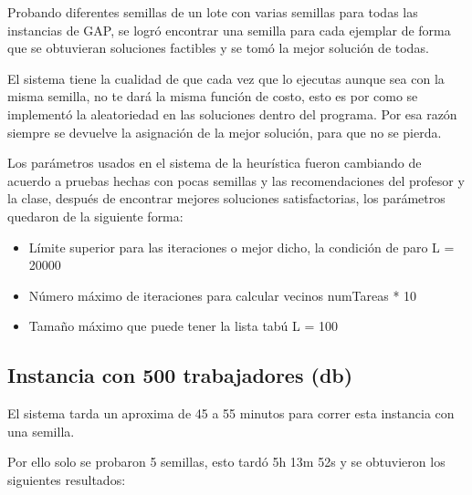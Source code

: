 \documentclass{article}
\begin{document}
Probando diferentes semillas de un lote con varias semillas para todas las instancias de GAP, se logró encontrar una semilla para cada ejemplar de forma que se obtuvieran soluciones factibles y se tomó la mejor solución de todas.

El sistema tiene la cualidad de que cada vez que lo ejecutas aunque sea con la misma semilla, no te dará la misma función de costo, esto es por como se implementó la aleatoriedad en las soluciones dentro del programa. Por esa razón siempre se devuelve la asignación de la mejor solución, para que no se pierda. 

Los parámetros usados en el sistema de la heurística fueron cambiando de acuerdo a pruebas hechas con pocas semillas y las recomendaciones del profesor y la clase, después de encontrar mejores soluciones satisfactorias, los parámetros quedaron de la siguiente forma:
\begin{itemize}
\item Límite superior para las iteraciones o mejor dicho, la condición de paro
L = 20000
\item Número máximo de iteraciones para calcular vecinos 
numTareas * 10
\item Tamaño máximo que puede tener la lista tabú
L = 100
\end{itemize}

\subsection{Instancia con 500 trabajadores (db)}

El sistema tarda un aproxima de 45 a 55 minutos para correr esta instancia con una semilla.

Por ello solo se probaron 5 semillas, esto tardó 5h 13m 52s y se obtuvieron los siguientes resultados:
\end{document}
